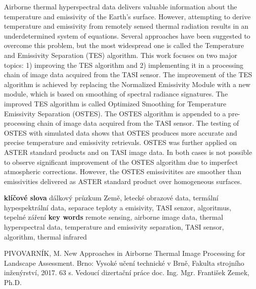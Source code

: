 \documentclass[oneside,12pt]{book}%
\begin{document}
\noindent Airborne thermal hyperspectral data delivers valuable information about the temperature and emissivity of the Earth's surface. However, attempting to derive temperature and emissivity from remotely sensed thermal radiation results in an underdetermined system of equations. Several approaches have been suggested to overcome this problem, but the most widespread one is called the Temperature and Emissivity Separation (TES) algorithm. This work focuses on two major topics: 1) improving the TES algorithm and 2) implementing it in a processing chain of image data acquired from the TASI sensor. The improvement of the TES algorithm is achieved by replacing the Normalized Emissivity Module with a new module, which is based on smoothing of spectral radiance signatures. The improved TES algorithm is called Optimized Smoothing for Temperature Emissivity Separation (OSTES). The OSTES algorithm is appended to a pre-processing chain of image data acquired from the TASI sensor. The testing of OSTES with simulated data shows that OSTES produces more accurate and precise temperature and emissivity retrievals. OSTES was further applied on ASTER standard products and on TASI image data. In both cases is not possible to observe significant improvement of the OSTES algorithm due to imperfect atmospheric corrections. However, the OSTES emissivitites are smoother than emissivities delivered as ASTER standard product over homogeneous surfaces.

\newpage \hspace*{0.1cm} \thispagestyle{empty}
\newline
\noindent\textbf{klíčové slova}\newline
dálkový průzkum Země, letecké obrazové data, termální hypespektrální data, separace teploty a emisivity, TASI senzor, algoritmus, tepelné záření
\newline
\newline
\textbf{key words}\newline
remote sensing, airborne image data, thermal hyperspectral data, temperature and emissivity separation, TASI sensor, algorithm, thermal infrared
\vspace{17cm}

\noindent PIVOVARNÍK, M. New Approaches in Airborne Thermal Image Processing for Landscape Assessment. Brno: Vysoké učení technické v Brně, Fakulta strojního inženýrství, 2017. 63 s. Vedoucí dizertační práce doc. Ing. Mgr. František Zemek, Ph.D.

\end{document}
